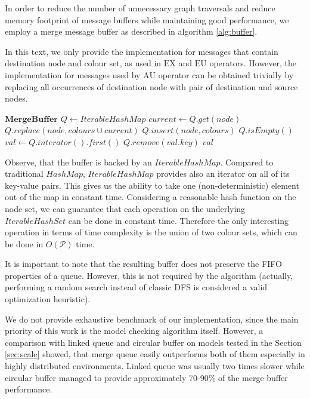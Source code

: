 \documentclass[12pt,oneside]{fithesis2}
\newcommand{\params}{\mathcal{P}}
\newcommand{\eu}[2]{\ensuremath{\mbox{E} #1 \mbox{U} #2 }}
\newcommand{\au}[2]{\ensuremath{\mbox{A} #1 \mbox{U} #2 }}
\newcommand{\ex}[1]{\ensuremath{\mbox{EX} #1}}
\begin{document}
			In order to reduce the number of unnecessary graph traversals and reduce memory footprint of message buffers while maintaining good performance, we employ a merge message buffer as described in algorithm \ref{alg:buffer}. 
			
			In this text, we only provide the implementation for messages that contain destination node and colour set, as used in $\ex{}$ and $\eu{}{}$ operators. However, the implementation for messages used by $\au{}{}$ operator can be obtained trivially by replacing all occurrences of destination node with pair of destination and source nodes.
			
			\begin{algorithm}
			\label{alg:buffer}
			\begin{algorithmic}[1]
			\State $ \textbf{MergeBuffer} $
			\State $ Q \gets IterableHashMap $
					\State $current \gets Q.get(node)$
					\State $Q.replace(node, colours \cup current)$
				\Else
					\State $Q.insert(node, colours)$				
				\EndIf
			\EndProcedure
				\State \Return $Q.isEmpty()$
			\EndProcedure
				\State $val \gets Q.interator().first()$
				\State $Q.remove(val.key)$
				\State \Return $val$
			\EndProcedure
			\end{algorithmic}				
			\end{algorithm}
			
			Observe, that the buffer is backed by an $IterableHashMap$. Compared to traditional $HashMap$, $IterableHashMap$ provides also an iterator on all of its key-value pairs. This gives us the ability to take one (non-deterministic) element out of the map in constant time. Considering a reasonable hash function on the node set, we can guarantee that each operation on the underlying $IterableHashSet$ can be done in constant time. Therefore the only interesting operation in terms of time complexity is the union of two colour sets, which can be done in $O(\params)$ time.
			
			It is important to note that the resulting buffer does not preserve the FIFO properties of a queue. However, this is not required by the algorithm (actually, performing a random search instead of classic DFS is considered a valid optimization heuristic).
			
			We do not provide exhaustive benchmark of our implementation, since the main priority of this work is the model checking algorithm itself. However, a comparison with linked queue and circular buffer on models tested in the Section \ref{sec:scale} showed, that merge queue easily outperforms both of them especially in highly distributed environments. Linked queue was usually two times slower while circular buffer managed to provide approximately 70-90\% of the merge buffer performance. 
			
\end{document}
